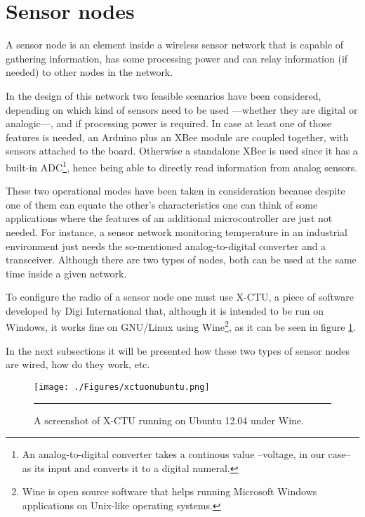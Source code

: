 
\section{Sensor nodes}

A sensor node is an element inside a wireless sensor network that is capable of gathering information, has some processing power and can relay information (if needed) to other nodes in the network\citep{chong2003sensor}.

In the design of this network two feasible scenarios have been considered, depending on which kind of sensors need to be used ---whether they are digital or analogic---, and if processing power is required. In case at least one of those features is needed, an Arduino plus an XBee\textregistered{} module are coupled together, with sensors attached to the board. Otherwise a standalone XBee\textregistered{} is used since it has a built-in ADC\footnote{An analog-to-digital converter takes a continous value --voltage, in our case-- as its input and converts it to a digital numeral.}, hence being able to directly read information from analog sensors.

These two operational modes have been taken in consideration because despite one of them can equate the other's characteristics one can think of some applications where the features of an additional microcontroller are just not needed. For instance, a sensor network monitoring temperature in an industrial environment just needs the so-mentioned analog-to-digital converter and a transceiver. Although there are two types of nodes, both can be used at the same time inside a given network.

To configure the radio of a sensor node one must use X-CTU, a piece of software developed by Digi International that, although it is intended to be run on Windows, it works fine on GNU/Linux using Wine\footnote{Wine is open source software that helps running Microsoft Windows applications on Unix-like operating systems.}, as it can be seen in figure \ref{fig:xctuonubuntu}.

In the next subsections it will be presented how these two types of sensor nodes are wired, how do they work, etc.

\begin{figure}[htbp]
    \centering
        \texttt{[image: ./Figures/xctuonubuntu.png]}
        \rule{35em}{0.5pt}
        \caption[Screenshot of X-CTU]{A screenshot of X-CTU running on Ubuntu 12.04 under Wine.}
    \label{fig:xctuonubuntu}
\end{figure}

